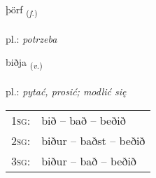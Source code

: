\documentclass[frontgrid, backgrid]{flacards}\usepackage[]{graphicx}\usepackage[]{xcolor}
\begin{document}
\renewcommand{\flhead}{\vskip5pt \fboxsep=0pt {\small\bfseries\footnotesize Nafnorð | rzeczownik}}
\renewcommand{\fcfoot}{\vskip5pt \fboxsep=0pt \hspace{2pt}{\small\bfseries\footnotesize 1K}}

\renewcommand{\blhead}{\vskip5pt {\small\bfseries\footnotesize Nafnorð | rzeczownik }}
\renewcommand{\bcfoot}{\vskip5pt \hspace{2pt}{\small\bfseries\footnotesize 1K}}


{þörf \small{\textsubscript{(\textit{f.})}} \\[1ex] %
\textphonetic{[θœrv]} \\
pl.: \emph{potrzeba} \\  [2ex]
\renewcommand*{\arraystretch}{0.8}
}

\renewcommand{\flhead}{\vskip5pt \fboxsep=0pt {\small\bfseries\footnotesize Sagnorð | czasownik}}
\renewcommand{\fcfoot}{\vskip5pt \fboxsep=0pt \hspace{2pt}{\small\bfseries\footnotesize 1K}}

\renewcommand{\blhead}{\vskip5pt {\small\bfseries\footnotesize Sagnorð | czasownik }}
\renewcommand{\bcfoot}{\vskip5pt \hspace{2pt}{\small\bfseries\footnotesize 1K}}


{biðja \small{\textsubscript{(\textit{v.})}} \\[1ex] %
\textphonetic{[pɪðja]} \\
pl.: \emph{pytać, prosić; modlić się} \\  [2ex]
\renewcommand*{\arraystretch}{0.8}
\begin{tabular}{p{1cm}l}
\textsc{1sg}: & bið -- bað -- beðið \\ 
\textsc{2sg}: & biður -- baðst -- beðið \\ 
\textsc{3sg}: & biður -- bað -- beðið \\ 
\end{tabular}
}
\end{document}
